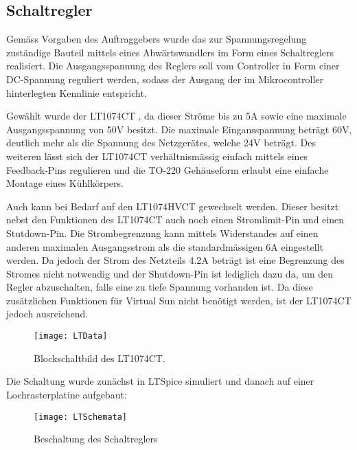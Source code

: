 \subsection{Schaltregler}\label{schaltregler}

Gemäss Vorgaben des Auftraggebers wurde das zur Spannungsregelung zuständige Bauteil mittels eines Abwärtswandlers im Form eines Schaltreglers realisiert. Die Ausgangsspannung des Reglers soll vom Controller in Form einer DC-Spannung reguliert werden, sodass der Ausgang der im Mikrocontroller hinterlegten Kennlinie entspricht. 

Gewählt wurde der LT1074CT , da dieser Ströme bis zu 5A sowie eine maximale Ausgangsspannung von 50V besitzt. Die maximale Eingansspannung beträgt 60V, deutlich mehr als die Spannung des Netzgerätes, welche 24V beträgt.
Des weiteren lässt sich der LT1074CT verhältnismässig einfach mittels eines Feedback-Pins regulieren und die TO-220 Gehäuseform erlaubt eine einfache Montage eines Kühlkörpers.

Auch kann bei Bedarf auf den LT1074HVCT  gewechselt werden. Dieser besitzt nebst den Funktionen des LT1074CT auch noch einen Stromlimit-Pin und einen Stutdown-Pin. Die Strombegrenzung kann mittels Widerstandes auf einen anderen maximalen Ausgangsstrom als die standardmässigen 6A  eingestellt werden. Da jedoch der Strom des Netzteils 4.2A beträgt ist eine Begrenzung des Stromes nicht notwendig und  der Shutdown-Pin ist lediglich dazu da, um den Regler abzuschalten, falls eine zu tiefe Spannung vorhanden ist. Da diese zusätzlichen Funktionen für Virtual Sun nicht benötigt werden, ist der LT1074CT jedoch ausreichend. 

\begin{figure}[h]
\centering
\texttt{[image: LTData]}%
\caption{Blockschaltbild des LT1074CT.}
\label{fig::LTData}
\end{figure}

Die Schaltung wurde zunächst in LTSpice simuliert und danach auf einer Lochrasterplatine aufgebaut: 

\begin{figure}[h]
\centering
\texttt{[image: LTSchemata]}%
\caption{Beschaltung des Schaltreglers}%
\label{fig::LTSchemata}%
\end{figure}


